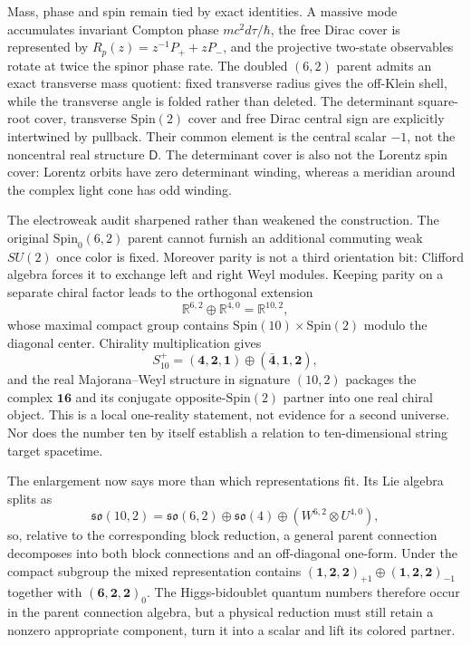 \documentclass[11pt]{article}
\theoremstyle{definition}\newtheorem{definition}[theorem]{Definition}
\theoremstyle{remark}\newtheorem{remark}[theorem]{Remark}\newtheorem{conjecture}[theorem]{Conjecture}
\begin{document}
Mass, phase and spin remain tied by exact identities. A massive mode accumulates invariant Compton phase $mc^2d\tau/\hbar$, the free Dirac cover is represented by $R_p(z)=z^{-1}P_++zP_-$, and the projective two-state observables rotate at twice the spinor phase rate. The doubled $(6,2)$ parent admits an exact transverse mass quotient: fixed transverse radius gives the off-Klein shell, while the transverse angle is folded rather than deleted. The determinant square-root cover, transverse $\mathrm{Spin}(2)$ cover and free Dirac central sign are explicitly intertwined by pullback. Their common element is the central scalar $-1$, not the noncentral real structure $\mathsf D$. The determinant cover is also not the Lorentz spin cover: Lorentz orbits have zero determinant winding, whereas a meridian around the complex light cone has odd winding.

The electroweak audit sharpened rather than weakened the construction. The original $\mathrm{Spin}_0(6,2)$ parent cannot furnish an additional commuting weak $SU(2)$ once color is fixed. Moreover parity is not a third orientation bit: Clifford algebra forces it to exchange left and right Weyl modules. Keeping parity on a separate chiral factor leads to the orthogonal extension
\begin{equation}
 \mathbb R^{6,2}\oplus\mathbb R^{4,0}=\mathbb R^{10,2},
\end{equation}
whose maximal compact group contains $\mathrm{Spin}(10)\times\mathrm{Spin}(2)$ modulo the diagonal center. Chirality multiplication gives
\begin{equation}
 S_{10}^+=(\mathbf4,\mathbf2,\mathbf1)\oplus(\bar{\mathbf4},\mathbf1,\mathbf2),
\end{equation}
and the real Majorana--Weyl structure in signature $(10,2)$ packages the complex $\mathbf{16}$ and its conjugate opposite-$\mathrm{Spin}(2)$ partner into one real chiral object. This is a local one-reality statement, not evidence for a second universe. Nor does the number ten by itself establish a relation to ten-dimensional string target spacetime.

The enlargement now says more than which representations fit. Its Lie algebra splits as
\begin{equation}
 \mathfrak{so}(10,2)=\mathfrak{so}(6,2)\oplus\mathfrak{so}(4)
 \oplus(W^{6,2}\otimes U^{4,0}),
\end{equation}
so, relative to the corresponding block reduction, a general parent connection decomposes into both block connections and an off-diagonal one-form. Under the compact subgroup the mixed representation contains
$(\mathbf1,\mathbf2,\mathbf2)_{+1}\oplus
(\mathbf1,\mathbf2,\mathbf2)_{-1}$ together with
$(\mathbf6,\mathbf2,\mathbf2)_0$. The Higgs-bidoublet quantum numbers therefore occur in the parent connection algebra, but a physical reduction must still retain a nonzero appropriate component, turn it into a scalar and lift its colored partner.
\end{document}
